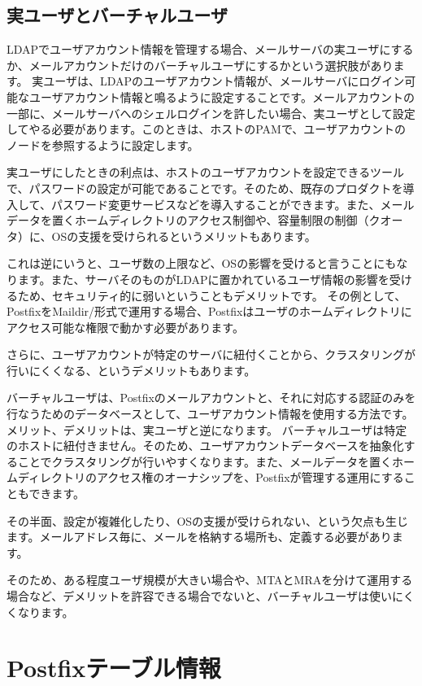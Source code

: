 \subsection{実ユーザとバーチャルユーザ}

LDAPでユーザアカウント情報を管理する場合、メールサーバの実ユーザにするか、メールアカウントだけのバーチャルユーザにするかという選択肢があります。
実ユーザは、LDAPのユーザアカウント情報が、メールサーバにログイン可能なユーザアカウント情報と鳴るように設定することです。メールアカウントの一部に、メールサーバへのシェルログインを許したい場合、実ユーザとして設定してやる必要があります。このときは、ホストのPAMで、ユーザアカウントのノードを参照するように設定します。

実ユーザにしたときの利点は、ホストのユーザアカウントを設定できるツールで、パスワードの設定が可能であることです。そのため、既存のプロダクトを導入して、パスワード変更サービスなどを導入することができます。また、メールデータを置くホームディレクトリのアクセス制御や、容量制限の制御（クオータ）に、OSの支援を受けられるというメリットもあります。

これは逆にいうと、ユーザ数の上限など、OSの影響を受けると言うことにもなります。また、サーバそのものがLDAPに置かれているユーザ情報の影響を受けるため、セキュリティ的に弱いということもデメリットです。
その例として、PostfixをMaildir/形式で運用する場合、Postfixはユーザのホームディレクトリにアクセス可能な権限で動かす必要があります。

さらに、ユーザアカウントが特定のサーバに紐付くことから、クラスタリングが行いにくくなる、というデメリットもあります。


バーチャルユーザは、Postfixのメールアカウントと、それに対応する認証のみを行なうためのデータベースとして、ユーザアカウント情報を使用する方法です。メリット、デメリットは、実ユーザと逆になります。
バーチャルユーザは特定のホストに紐付きません。そのため、ユーザアカウントデータベースを抽象化することでクラスタリングが行いやすくなります。また、メールデータを置くホームディレクトリのアクセス権のオーナシップを、Postfixが管理する運用にすることもできます。

その半面、設定が複雑化したり、OSの支援が受けられない、という欠点も生じます。メールアドレス毎に、メールを格納する場所も、定義する必要があります。

そのため、ある程度ユーザ規模が大きい場合や、MTAとMRAを分けて運用する場合など、デメリットを許容できる場合でないと、バーチャルユーザは使いにくくなります。


\section{Postfixテーブル情報}

